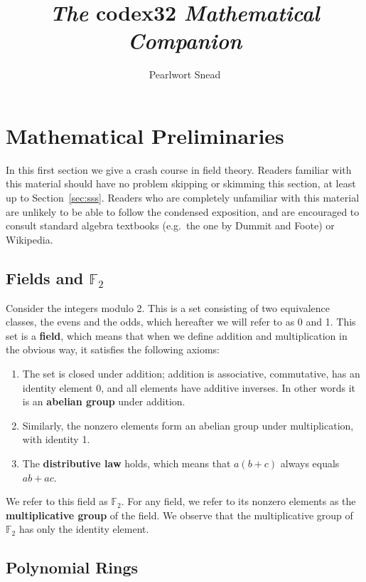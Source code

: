 \documentclass[letterpaper]{article}
\title{
    \emph{The} codex32 \emph{Mathematical Companion}
}
\author{Pearlwort Snead}
\date{
}
\newcommand{\ftwo}{\mathbb{F}_2}
\begin{document}
\maketitle
\tableofcontents

\section{Mathematical Preliminaries}

In this first section we give a crash course in field theory. Readers familiar
with this material should have no problem skipping or skimming this section,
at least up to Section~\ref{sec:sss}.
Readers who are completely unfamiliar with this material are unlikely to be
able to follow the condensed exposition, and are encouraged to consult
standard algebra textbooks (e.g.~the one by Dummit and Foote) or Wikipedia.

\subsection{Fields and $\ftwo$}
Consider the integers modulo 2. This is a set consisting of two equivalence
classes, the evens and the odds, which hereafter we will refer to as 0 and 1.
This set is a \textbf{field}, which means that when we define addition and
multiplication in the obvious way, it satisfies the following axioms:
\begin{enumerate}
\item The set is closed under addition; addition is associative, commutative,
has an identity element 0, and all elements have additive inverses. In other
words it is an \textbf{abelian group} under addition.
\item Similarly, the nonzero elements form an abelian group under multiplication, with identity 1.
\item The \textbf{distributive law} holds, which means that $a(b + c)$ always
equals $ab + ac$.
\end{enumerate}

We refer to this field as $\ftwo$. For any field, we refer to its nonzero
elements as the \textbf{multiplicative group} of the field. We observe that
the multiplicative group of $\ftwo$ has only the identity element.

\subsection{Polynomial Rings}
\end{document}
